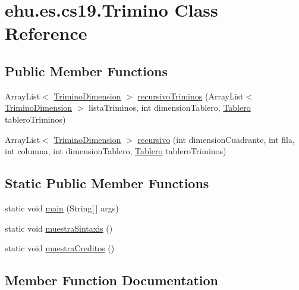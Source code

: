 \hypertarget{classehu_1_1es_1_1cs19_1_1_trimino}{}\section{ehu.\+es.\+cs19.\+Trimino Class Reference}
\label{classehu_1_1es_1_1cs19_1_1_trimino}
\subsection*{Public Member Functions}
\begin{DoxyCompactItemize}
\item 
Array\+List$<$ \mbox{\hyperlink{classehu_1_1es_1_1cs19_1_1_trimino_dimension}{Trimino\+Dimension}} $>$ \mbox{\hyperlink{classehu_1_1es_1_1cs19_1_1_trimino_a51b2ab0a3e2f28abeb08491eff76263f}{recursivo\+Triminos}} (Array\+List$<$ \mbox{\hyperlink{classehu_1_1es_1_1cs19_1_1_trimino_dimension}{Trimino\+Dimension}} $>$ lista\+Triminos, int dimension\+Tablero, \mbox{\hyperlink{classehu_1_1es_1_1cs19_1_1_tablero}{Tablero}} tablero\+Triminos)
\item 
Array\+List$<$ \mbox{\hyperlink{classehu_1_1es_1_1cs19_1_1_trimino_dimension}{Trimino\+Dimension}} $>$ \mbox{\hyperlink{classehu_1_1es_1_1cs19_1_1_trimino_abd23f49420710afeb6637e00079a4fe3}{recursivo}} (int dimension\+Cuadrante, int fila, int columna, int dimension\+Tablero, \mbox{\hyperlink{classehu_1_1es_1_1cs19_1_1_tablero}{Tablero}} tablero\+Triminos)
\end{DoxyCompactItemize}
\subsection*{Static Public Member Functions}
\begin{DoxyCompactItemize}
\item 
static void \mbox{\hyperlink{classehu_1_1es_1_1cs19_1_1_trimino_a5ec5898940f98093af7112ce516c567f}{main}} (String\mbox{[}$\,$\mbox{]} args)
\item 
static void \mbox{\hyperlink{classehu_1_1es_1_1cs19_1_1_trimino_a18bc64d050250fd954522df292a24ae2}{muestra\+Sintaxis}} ()
\item 
static void \mbox{\hyperlink{classehu_1_1es_1_1cs19_1_1_trimino_a8f19765e217f2fdf9899c796ae2fb074}{muestra\+Creditos}} ()
\end{DoxyCompactItemize}


\subsection{Member Function Documentation}
\mbox{\label{classehu_1_1es_1_1cs19_1_1_trimino_a5ec5898940f98093af7112ce516c567f}} 
